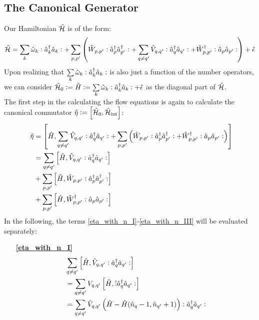 \begin{appendix}
\subsection{The Canonical Generator}
Our Hamiltonian $\hat{\mathcal{H}}$ is of the form:
\begin{align}
\hat{\mathcal{H}} = \sum\limits_k \hat\omega_k \vcentcolon\hat a^\dagger_k\hat a_k\vcentcolon+\sum\limits_{p,p^\prime}\left(\hat W_{p,p^\prime}\vcentcolon \hat a^\dagger_p\hat a^\dagger_{p^\prime}\vcentcolon+\sum\limits_{q\neq q^\prime}\hat V_{q,q^\prime}\vcentcolon \hat a^\dagger_q\hat a_{q^\prime}\vcentcolon+\hat W_{p,p^\prime}^\dagger\vcentcolon\hat a_p\hat a_{p^\prime}\vcentcolon\right)+\hat\epsilon
\end{align}
Upon realizing that $\sum\limits_k \hat\omega_k \vcentcolon\hat a^\dagger_k\hat a_k\vcentcolon$ is also just a function of the number operators, we can consider $\hat{\mathcal{H}}_0\vcentcolon=\hat H\vcentcolon= \sum\limits_k \hat\omega_k \vcentcolon\hat a^\dagger_k\hat a_k\vcentcolon+\hat\epsilon$ as the diagonal part of $\hat{\mathcal{H}}$. \\
The first step in the calculating the flow equations is again to calculate the canonical commutator $\hat\eta\vcentcolon=\left[\hat{\mathcal{H}}_0,\hat{\mathcal{H}}_{\mathrm{int}}\right]$:
\begin{subequations}
\begin{align}
\hat\eta &= \left[\hat H,\sum\limits_{q\neq q^\prime}\hat V_{q,q^\prime}\vcentcolon \hat a^\dagger_q\hat a_{q^\prime}\vcentcolon+\sum\limits_{p,p^\prime}\left(\hat W_{p,p^\prime}\vcentcolon \hat a^\dagger_p\hat a^\dagger_{p^\prime}\vcentcolon+\hat W_{p,p^\prime}^\dagger\vcentcolon\hat a_p\hat a_{p^\prime}\vcentcolon\right)\right]  \nonumber\\ \quad& 
=  \sum\limits_{q\neq q^\prime}\left[\hat H,\hat V_{q,q^\prime}\vcentcolon \hat a^\dagger_q\hat a_{q^\prime}\vcentcolon\right] \label{eta_with_n_I}\\ \quad& 
+ \sum\limits_{p,p^\prime}\left[\hat H,\hat W_{p,p^\prime}\vcentcolon \hat a^\dagger_p\hat a^\dagger_{p^\prime}\vcentcolon\right] \label{eta_with_n_II} \\ \quad& 
+ \sum\limits_{p,p^\prime}\left[\hat H,\hat W_{p,p^\prime}^\dagger\vcentcolon\hat a_p\hat a_{p^\prime} \vcentcolon \right] \label{eta_with_n_III}
\end{align}
\end{subequations}
In the following, the terms \ref{eta_with_n_I}-\ref{eta_with_n_III} will be evaluated separately:
\begin{itemize}
\item[\textbf{\ref{eta_with_n_I}}] 
\begin{align}
&\Sum_{q\neq q^\prime}\left[\hat H,\hat V_{q,q^\prime}\NO \CR_q\AN_{q^\prime}\NO\right]\nonumber\\
&= \Sum_{q\neq q^\prime}V_{q,q^\prime}\left[\hat H,\hat \NO \CR_q\AN_{q^\prime}\NO\right] \nonumber \\ 
&=  \Sum_{q\neq q^\prime}\hat V_{q,q^\prime} \left(\hat H - \hat H(\hat n_q-1,\hat n_{q^\prime}+1)\right) \NO \CR_q\AN_{q^\prime}\NO \\

\end{align}
\end{itemize}
\end{appendix}
